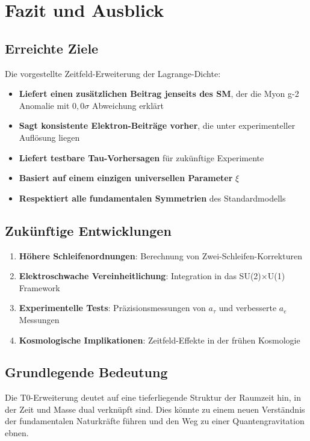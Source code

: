 \documentclass[12pt,a4paper]{article}
\theoremstyle{definition}
\begin{document}
	\section{Fazit und Ausblick}
	
	\subsection{Erreichte Ziele}
	
	Die vorgestellte Zeitfeld-Erweiterung der Lagrange-Dichte:
	
	\begin{itemize}
		\item \textbf{Liefert einen zusätzlichen Beitrag jenseits des SM}, der die Myon g-2 Anomalie mit $0,0\sigma$ Abweichung erklärt
		\item \textbf{Sagt konsistente Elektron-Beiträge vorher}, die unter experimenteller Auflösung liegen
		\item \textbf{Liefert testbare Tau-Vorhersagen} für zukünftige Experimente
		\item \textbf{Basiert auf einem einzigen universellen Parameter} $\xi$
		\item \textbf{Respektiert alle fundamentalen Symmetrien} des Standardmodells
	\end{itemize}
	
	\subsection{Zukünftige Entwicklungen}
	
	\begin{enumerate}
		\item \textbf{Höhere Schleifenordnungen}: Berechnung von Zwei-Schleifen-Korrekturen
		\item \textbf{Elektroschwache Vereinheitlichung}: Integration in das SU(2)×U(1) Framework
		\item \textbf{Experimentelle Tests}: Präzisionsmessungen von $a_\tau$ und verbesserte $a_e$ Messungen
		\item \textbf{Kosmologische Implikationen}: Zeitfeld-Effekte in der frühen Kosmologie
	\end{enumerate}
	
	\subsection{Grundlegende Bedeutung}
	
	Die T0-Erweiterung deutet auf eine tieferliegende Struktur der Raumzeit hin, in der Zeit und Masse dual verknüpft sind. Dies könnte zu einem neuen Verständnis der fundamentalen Naturkräfte führen und den Weg zu einer Quantengravitation ebnen.
	
\end{document}
